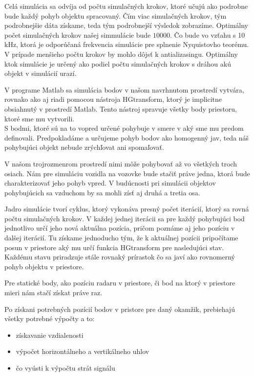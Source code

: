 \documentclass[slovak]{ExcelAtFIT} %
\begin{document}
    Celá simulácia sa odvíja od počtu simulačných krokov, ktoré učujú ako podrobne bude každý pohyb objektu spracovaný. Čím viac simulačných krokov, tým podrobnejšie dáta získame, teda tým podrobnejší výsledok zobrazíme. Optimálny počet simulačných krokov našej simmulácie bude $10 000$. Čo bude vo vzťahu s 10 kHz, ktorá je odporúčaná frekvencia simu\-lácie pre splnenie Nyquistovho teorému. V prípade menšieho počtu krokov by mohlo dôjsť k antializasingu. Optimálny ktok simulácie je určený ako podiel počtu simulačných krokov s dráhou akú objekt v simulácií urazí.

    V programe Matlab sa simulácia bodov v našom navrhnutom prostredí vytvára, rovnako ako aj riadi pomocou nástroja HGtransform, ktorý je implicitne obsiahnutý v prostredí Matlab. Tento nástroj spravuje všetky body priestoru, ktoré sme mu vytvorili.\\ S bodmi, ktoré sú na to vopred určené pohybuje v smere v aký sme mu predom definovali. Predpokladáme a určujeme pohyb bodov ako homogenný jav, teda náš pohybujúci objekt nebude zrýchľovat ani spomaľovať.

    V našom trojrozmenrom prostredí nimi môže pohybovať až vo všetkých troch osiach. Nám pre simuláciu vozidla na vozovke bude stačiť práve jedna, ktorá bude charakterizovať jeho pohyb vpred. V budúcnosti pri simulácii objektov pohybujúcich sa vzduchom by sa mohli zísť aj druhá a tretia osa.    

    Jadro simulácie tvorí cyklus, ktorý vykonáva presný počet iterácií, ktorý sa rovná počtu simulačných krokov. V každej jednej iterácii sa pre každý pohybujúci bod jednotlivo určí jeho nová aktuálna pozícia, pričom poznáme aj jeho pozíciu v dalšej iterácií. Tu získame jednoducho tým, že k aktuálnej pozícii pripočítame posun v priestore aký mu určí funkcia HGtransform pre nasledujúci stav. Každému stavu priradzuje stále rovnaký prírastok čo sa javí ako rovnomerný pohyb objektu v priestore. 

    Pre statické body, ako pozíciu radaru v priestore, či bod na ktorý v priestore mieri nám stačí získat práve raz.

    Po získani potrebných pozícií bodov v pristore pre daný okamžik, prebiehajú všetky potrebné výpočty a to:
    \begin{itemize} 
      \item získavanie vzdialenosti
      \item výpočet horizontálneho a vertikálneho uhlov
      \item čo vyústi k výpočtu strát signálu
    \end{itemize}
\end{document}
